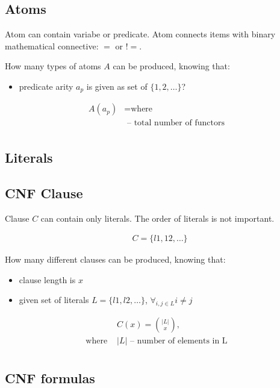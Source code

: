\subsection{Atoms}

Atom can contain variabe or predicate. Atom connects items with binary mathematical connective: $=$ or $!=$.

How many types of atoms $A$ can be produced, knowing that:
\begin{itemize}
	\item predicate arity $a_p$ is given as set of $\{1,2,\dots\}$?
\end{itemize}

\begin{align*}
	A(a_p) &=
	\text{where} \\
	& \text{ -- total number of functors} \\
\end{align*}

\subsection{Literals}

\subsection{CNF Clause}

Clause $C$ can contain only literals. The order of literals is not important.

\begin{align*}
	&C = \{l1, 12, \dots\}
\end{align*}

How many different clauses can be produced, knowing that:
\begin{itemize}
	\item clause length is $x$
	\item given set of literals $L = \{l1, l2, \dots\}$, $\forall_{i,j \in L} i \neq j$
\end{itemize}

\begin{align*}
	&C(x) = \binom{|L|}{x}, \\
	\text{where }
	&|L| \text{ -- number of elements in L} \\
\end{align*}

\subsection{CNF formulas}

